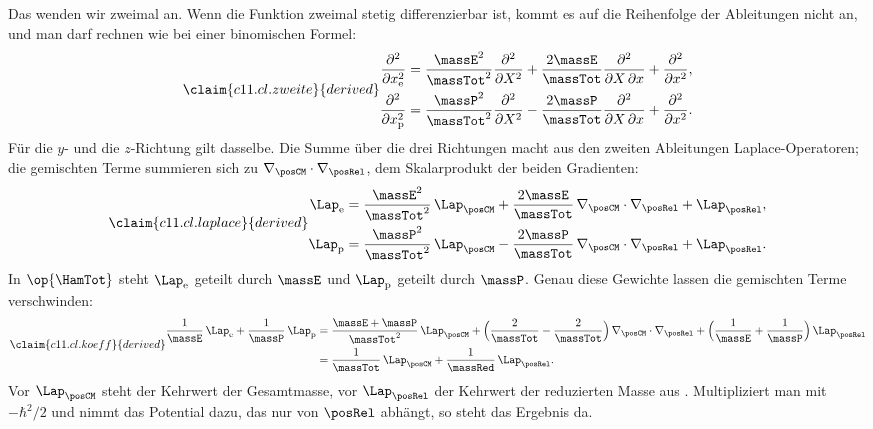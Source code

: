 Das wenden wir zweimal an. Wenn die Funktion zweimal stetig differenzierbar ist, kommt
es auf die Reihenfolge der Ableitungen nicht an, und man darf rechnen wie bei einer
binomischen Formel:
\begin{equation}\label{c11.eq.zweite}\claim{c11.cl.zweite}{derived}
  \begin{aligned}
    \frac{\partial^2}{\partial x_{\mathrm{e}}^2}
    &= \frac{\massE^2}{\massTot^2}\frac{\partial^2}{\partial X^2}
     + \frac{2\massE}{\massTot}\frac{\partial^2}{\partial X\,\partial x}
     + \frac{\partial^2}{\partial x^2}, \\
    \frac{\partial^2}{\partial x_{\mathrm{p}}^2}
    &= \frac{\massP^2}{\massTot^2}\frac{\partial^2}{\partial X^2}
     - \frac{2\massP}{\massTot}\frac{\partial^2}{\partial X\,\partial x}
     + \frac{\partial^2}{\partial x^2}.
  \end{aligned}
\end{equation}
Für die $y$- und die $z$-Richtung gilt dasselbe. Die Summe über die drei Richtungen
macht aus den zweiten Ableitungen Laplace-Operatoren; die gemischten Terme summieren
sich zu $\nabla_{\posCM} \cdot \nabla_{\posRel}$, dem Skalarprodukt der beiden
Gradienten:
\begin{equation}\label{c11.eq.laplace}\claim{c11.cl.laplace}{derived}
  \begin{aligned}
    \Lap_{\mathrm{e}}
    &= \frac{\massE^2}{\massTot^2}\,\Lap_{\posCM}
     + \frac{2\massE}{\massTot}\,\nabla_{\posCM} \cdot \nabla_{\posRel}
     + \Lap_{\posRel}, \\
    \Lap_{\mathrm{p}}
    &= \frac{\massP^2}{\massTot^2}\,\Lap_{\posCM}
     - \frac{2\massP}{\massTot}\,\nabla_{\posCM} \cdot \nabla_{\posRel}
     + \Lap_{\posRel}.
  \end{aligned}
\end{equation}
In $\op{\HamTot}$ steht $\Lap_{\mathrm{e}}$ geteilt durch $\massE$ und $\Lap_{\mathrm{p}}$
geteilt durch $\massP$. Genau diese Gewichte lassen die gemischten Terme verschwinden:
\begin{equation}\label{c11.eq.koeff}\claim{c11.cl.koeff}{derived}
  \begin{aligned}
    \frac{1}{\massE}\,\Lap_{\mathrm{e}} + \frac{1}{\massP}\,\Lap_{\mathrm{p}}
    &= \frac{\massE + \massP}{\massTot^2}\,\Lap_{\posCM}
     + \Bigl(\frac{2}{\massTot} - \frac{2}{\massTot}\Bigr)\,
       \nabla_{\posCM} \cdot \nabla_{\posRel}
     + \Bigl(\frac{1}{\massE} + \frac{1}{\massP}\Bigr)\,\Lap_{\posRel} \\
    &= \frac{1}{\massTot}\,\Lap_{\posCM} + \frac{1}{\massRed}\,\Lap_{\posRel}.
  \end{aligned}
\end{equation}
Vor $\Lap_{\posCM}$ steht der Kehrwert der Gesamtmasse, vor $\Lap_{\posRel}$ der Kehrwert
der reduzierten Masse aus . Multipliziert man mit $-\hbar^2/2$ und nimmt das
Potential dazu, das nur von $\posRel$ abhängt, so steht das Ergebnis da.


